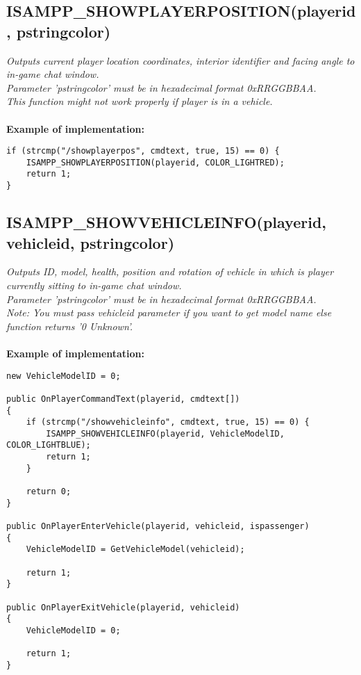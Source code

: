 \documentclass{article}
\begin{document}
\subsection{ISAMPP\_SHOWPLAYERPOSITION(playerid, pstringcolor)}

\textit{Outputs current player location coordinates, interior identifier and facing angle to in-game chat window.
\\Parameter 'pstringcolor' must be in hexadecimal format 0xRRGGBBAA.
\\This function might not work properly if player is in a vehicle.}
\\
\\
\textbf{Example of implementation:}
\begin{verbatim}
if (strcmp("/showplayerpos", cmdtext, true, 15) == 0) {
    ISAMPP_SHOWPLAYERPOSITION(playerid, COLOR_LIGHTRED);
    return 1;
}
\end{verbatim}


\newpage
\subsection{ISAMPP\_SHOWVEHICLEINFO(playerid, vehicleid, pstringcolor)}

\textit{Outputs ID, model, health, position and rotation of vehicle in which is player currently sitting to in-game chat window.
\\Parameter 'pstringcolor' must be in hexadecimal format 0xRRGGBBAA.
\\Note: You must pass vehicleid parameter if you want to get model name else function returns '0 Unknown'.}
\\
\\
\textbf{Example of implementation:}
\begin{verbatim}
new VehicleModelID = 0;

public OnPlayerCommandText(playerid, cmdtext[])
{
    if (strcmp("/showvehicleinfo", cmdtext, true, 15) == 0) {
        ISAMPP_SHOWVEHICLEINFO(playerid, VehicleModelID, COLOR_LIGHTBLUE);
        return 1;
    }

    return 0;
}

public OnPlayerEnterVehicle(playerid, vehicleid, ispassenger)
{
    VehicleModelID = GetVehicleModel(vehicleid);

    return 1;
}

public OnPlayerExitVehicle(playerid, vehicleid)
{
    VehicleModelID = 0;

    return 1;
}
\end{verbatim}
\end{document}
